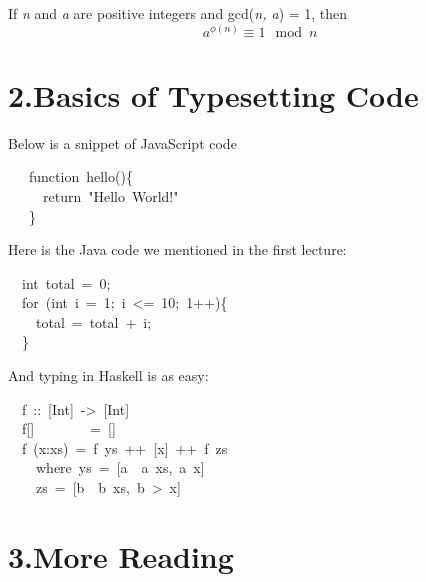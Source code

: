 \documentclass[11pt]{article}
\begin{document}
If \emph{n} and \emph{a} are positive integers and gcd(\emph{n, a}) = 1, then%
\label{thm-euler}%
\noindent{}
\noindent\[%
  a^{\phi(n)} \equiv1 \mod n
\]%

\section{2.\hspace*{0.5em}Basics of Typesetting Code}\label{sec-basics-of-typesetting-code}%

\noindent{}Below is a snippet of JavaScript code%
\begin{mdpre}%
\noindent~~~{function}~hello()\{\\
~~~~~{return}~{"}{Hello~World!}{"}\\
~~~\}%
\end{mdpre}\noindent{}Here is the Java code we mentioned in the first lecture:
\begin{mdpre}%
\noindent~~{int}~total~=~{0};\\
~~{for}~({int}~i~=~{1};~i~\textless{}=~{10};~{1}++)\{\\
~~~~total~=~total~+~i;\\
~~\}%
\end{mdpre}\noindent{}And typing in Haskell is as easy:
\begin{mdpre}%
\noindent~~f~{::}~{[}{Int}{]}~{-\textgreater{}}~{[}{Int}{]}\\
~~f{}[]~~~~~~~~{=}~{}[]\\
~~f~(x:xs)~{=}~f~ys~++~{}[x]~++~f~zs\\
~~~~{where}~ys~{=}~{}[a~{\textbar{}}~a~xs,~a~x]\\
~~~~zs~{=}~{}[b~{\textbar{}}~b~xs,~b~\textgreater{}~x]%
\end{mdpre}
\section{3.\hspace*{0.5em}More Reading}\label{sec-more-reading}%
\end{document}
